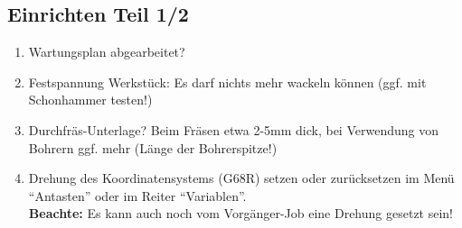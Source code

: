 \documentclass{\basedir/fablab-document}
\begin{document}
\subsection{Einrichten Teil 1/2} \label{einrichten}
\begin{enumerate}
	\item Wartungsplan abgearbeitet?
	\item Festspannung Werkstück: Es darf nichts mehr wackeln können (ggf. mit Schonhammer testen!)
	\item Durchfräs-Unterlage? Beim Fräsen etwa 2-5mm dick, bei Verwendung von Bohrern ggf. mehr (Länge der Bohrerspitze!)
	\item Drehung des Koordinatensystems (G68R) setzen oder zurücksetzen im Menü \enquote{Antasten} oder im Reiter \enquote{Variablen}.\\ \textbf{Beachte:} Es kann auch noch vom Vorgänger-Job eine Drehung gesetzt sein!
\end{enumerate}
\end{document}
